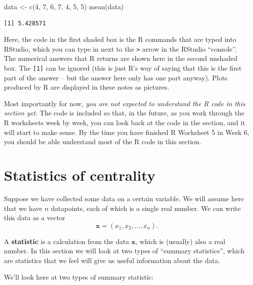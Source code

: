 \documentclass[
  a4paper,
]{book}
\newenvironment{Shaded}{\begin{snugshade}}{\end{snugshade}}
\newcommand{\DecValTok}[1]{\textcolor[rgb]{0.00,0.00,0.81}{#1}}
\newcommand{\FunctionTok}[1]{\textcolor[rgb]{0.00,0.00,0.00}{#1}}
\newcommand{\NormalTok}[1]{#1}
\newcommand{\OtherTok}[1]{\textcolor[rgb]{0.56,0.35,0.01}{#1}}
\theoremstyle{definition}
\theoremstyle{definition}
\theoremstyle{definition}
\theoremstyle{definition}
\theoremstyle{remark}
\begin{document}
\begin{Shaded}
\begin{Highlighting}[]
\NormalTok{data }\OtherTok{\textless{}{-}} \FunctionTok{c}\NormalTok{(}\DecValTok{4}\NormalTok{, }\DecValTok{7}\NormalTok{, }\DecValTok{6}\NormalTok{, }\DecValTok{7}\NormalTok{, }\DecValTok{4}\NormalTok{, }\DecValTok{5}\NormalTok{, }\DecValTok{5}\NormalTok{)}
\FunctionTok{mean}\NormalTok{(data)}
\end{Highlighting}
\end{Shaded}

\begin{verbatim}
[1] 5.428571
\end{verbatim}

Here, the code in the first shaded box is the R commands that are typed into
RStudio, which you can type in next to the \texttt{\textgreater{}} arrow in the RStudio ``console''. The numerical answers that R returns are shown here in the second unshaded box. The \texttt{{[}1{]}} can be ignored (this is just R's way of saying that this is the first part of the answer -- but the answer here only has one part anyway). Plots produced by R are displayed in these notes as pictures.

Most importantly for now, \emph{you are not expected to understand the R code in this section yet}. The code is included so that, in the future, as you work through the R worksheets week by week, you can look back at the code in the section, and it will start to make sense. By the time you have finished R Worksheet 5 in Week 6, you should be able understand most of the R code in this section.

\hypertarget{stat-central}{%
\section{Statistics of centrality}\label{stat-central}}

Suppose we have collected some data on a certain variable. We will assume here that we have \(n\) datapoints, each of which is a single real number. We can write this data as a vector
\[ \mathbf x = (x_1, x_2, \dots, x_n) . \]

A \textbf{statistic} is a calculation from the data \(\mathbf x\), which is (usually) also a real number. In this section we will look at two types of ``summary statistics'', which are statistics that we feel will give us useful information about the data.

We'll look here at two types of summary statistic:
\end{document}
